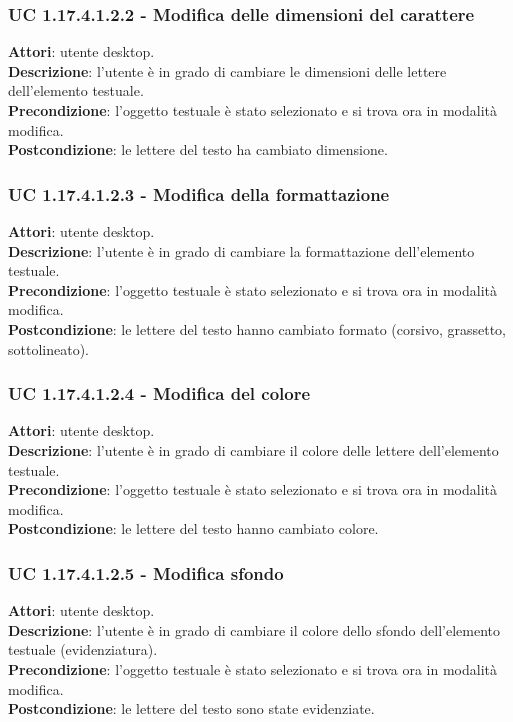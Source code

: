 {\subsubsection{UC 1.17.4.1.2.2 - Modifica delle dimensioni del carattere}{
	\label{uc1.17.4.1.2.2}
	\textbf{Attori}: utente desktop. \\
	\textbf{Descrizione}: l'utente è in grado di cambiare le dimensioni delle lettere dell’elemento testuale. \\
	\textbf{Precondizione}: l'oggetto testuale è stato selezionato e si trova ora in modalità modifica.\\
	\textbf{Postcondizione}: le lettere del testo ha cambiato dimensione.	\\
	}
\subsubsection{UC 1.17.4.1.2.3 - Modifica della formattazione}{
	\label{uc1.17.4.1.2.3}
	\textbf{Attori}: utente desktop. \\
	\textbf{Descrizione}: l'utente è in grado di cambiare la formattazione dell’elemento testuale. \\
	\textbf{Precondizione}: l'oggetto testuale è stato selezionato e si trova ora in modalità modifica.\\
	\textbf{Postcondizione}: le lettere del testo hanno cambiato formato (corsivo, grassetto, sottolineato).	\\
	}
\subsubsection{UC 1.17.4.1.2.4 - Modifica del colore}{
	\label{uc1.17.4.1.2.4}
	\textbf{Attori}: utente desktop. \\
	\textbf{Descrizione}: l'utente è in grado di cambiare il colore delle lettere dell’elemento testuale. \\
	\textbf{Precondizione}: l'oggetto testuale è stato selezionato e si trova ora in modalità modifica.\\
	\textbf{Postcondizione}: le lettere del testo hanno cambiato colore.	\\
	}
\subsubsection{UC 1.17.4.1.2.5 - Modifica sfondo}{
	\label{uc1.17.4.1.2.5}
	\textbf{Attori}: utente desktop. \\
	\textbf{Descrizione}: l'utente è in grado di cambiare il colore dello sfondo dell’elemento testuale (evidenziatura). \\
	\textbf{Precondizione}: l'oggetto testuale è stato selezionato e si trova ora in modalità modifica.\\
	\textbf{Postcondizione}: le lettere del testo sono state evidenziate.	\\
	}
}

